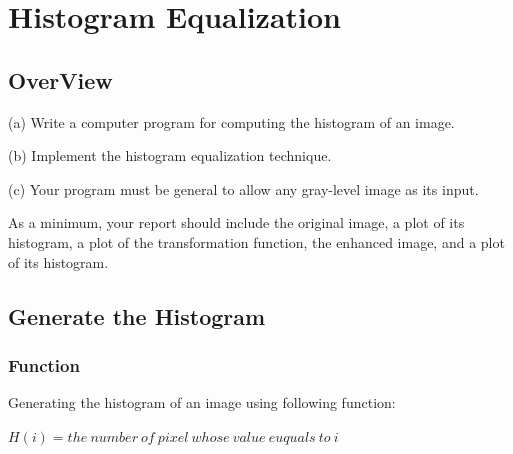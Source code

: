 \documentclass[11pt,oneside]{book}
\begin{document}


\tableofcontents

\chapter{Histogram Equalization}

\section{OverView}
(a) Write a computer program for computing the histogram of an image.

(b) Implement the histogram equalization technique.

(c) Your program must be general to allow any gray-level image as its input.

As a minimum, your report should include the original image, a plot of its histogram, a plot of the transformation function, the enhanced image, and a plot of its histogram.
\section{Generate the Histogram}
\subsection{Function}
Generating the histogram of an image using following function:\\
\begin{center}
$H(i) = the\ number\ of\ pixel\ whose\ value\ euquals\ to\ i$
\end{center}
\end{document}
